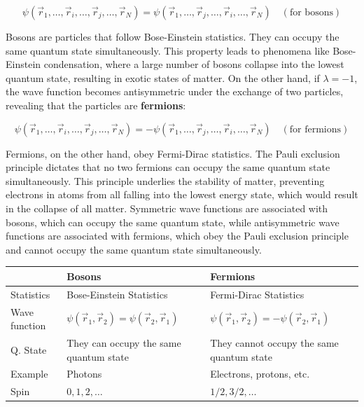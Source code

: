 \documentclass[12pt,a4paper]{report}
\newcommand{\esp}{\vspace{0.5cm}}
\begin{document}
	\begin{equation}
		\psi(\vec{r}_1, \dots, \vec{r}_i, \dots, \vec{r}_j, \dots, \vec{r}_N) = \psi(\vec{r}_1, \dots, \vec{r}_j, \dots, \vec{r}_i, \dots, \vec{r}_N) \quad (\text{for bosons})
	\end{equation}
	
	Bosons are particles that follow Bose-Einstein statistics. They can occupy the same quantum state simultaneously. This property leads to phenomena like Bose-Einstein condensation, where a large number of bosons collapse into the lowest quantum state, resulting in exotic states of matter. On the other hand, if $\lambda = -1$, the wave function becomes antisymmetric under the exchange of two particles, revealing that the particles are \textbf{fermions}:
	
	\begin{equation}
		\psi(\vec{r}_1, \dots, \vec{r}_i, \dots, \vec{r}_j, \dots, \vec{r}_N) = -\psi(\vec{r}_1, \dots, \vec{r}_j, \dots, \vec{r}_i, \dots, \vec{r}_N) \quad (\text{for fermions})
	\end{equation}
	
	Fermions, on the other hand, obey Fermi-Dirac statistics. The Pauli exclusion principle dictates that no two fermions can occupy the same quantum state simultaneously. This principle underlies the stability of matter, preventing electrons in atoms from all falling into the lowest energy state, which would result in the collapse of all matter. Symmetric wave functions are associated with bosons, which can occupy the same quantum state, while antisymmetric wave functions are associated with fermions, which obey the Pauli exclusion principle and cannot occupy the same quantum state simultaneously.
	
	\esp
	
	\begin{center}
		\begin{tabular}{|p{2.5cm}|p{5.5cm}|p{5.5cm}|}
			\hline
			& \textbf{Bosons} & \textbf{Fermions} \\
			\hline
			Statistics & Bose-Einstein Statistics & Fermi-Dirac Statistics \\
			\hline
			Wave function & $\psi(\vec{r}_1, \vec{r}_2) = \psi(\vec{r}_2, \vec{r}_1)$ & $\psi(\vec{r}_1, \vec{r}_2) = -\psi(\vec{r}_2, \vec{r}_1)$ \\
			\hline
			Q. State & They can occupy the same quantum state & They cannot occupy the same quantum state \\
			\hline
			Example & Photons & Electrons, protons, etc. \\
			\hline
			Spin & $0, 1, 2, \dots$ & $1/2, 3/2, \dots$ \\
			\hline
		\end{tabular}
	\end{center}
	
\end{document}
